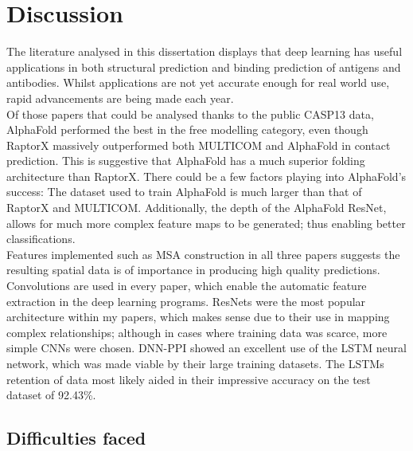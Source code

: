 \chapter{Discussion}

The literature analysed in this dissertation displays that deep learning has useful applications in both structural prediction and binding prediction of antigens and antibodies. Whilst applications are not yet accurate enough for real world use, rapid advancements are being made each year. 
\\[12pt]
Of those papers that could be analysed thanks to the public CASP13 data, AlphaFold performed the best in the free modelling category, even though RaptorX massively outperformed both MULTICOM and AlphaFold in contact prediction. This is suggestive that AlphaFold has a much superior folding architecture than RaptorX. There could be a few factors playing into AlphaFold's success: The dataset used to train AlphaFold is much larger than that of RaptorX and MULTICOM. Additionally, the depth of the AlphaFold ResNet, allows for much more complex feature maps to be generated; thus enabling better classifications. 
\\[12pt]
Features implemented such as MSA construction in all three papers suggests the resulting spatial data is of importance in producing high quality predictions. Convolutions are used in every paper, which enable the automatic feature extraction in the deep learning programs. ResNets were the most popular architecture within my papers, which makes sense due to their use in mapping complex relationships; although in cases where training data was scarce, more simple CNNs were chosen. DNN-PPI showed an excellent use of the LSTM neural network, which was made viable by their large training datasets. The LSTMs retention of data most likely aided in their impressive accuracy on the test dataset of 92.43\%.

\section{Difficulties faced}

